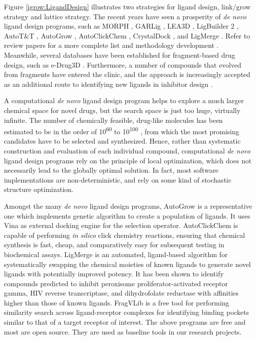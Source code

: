 Figure \ref{igrow:LigandDesign} \citep{363} illustrates two strategies for ligand design, link/grow strategy and lattice strategy. The recent years have seen a prosperity of \textit{de novo} ligand design programs, such as MORPH \citep{365}, GARLig \citep{471}, LEA3D \citep{1223}, LigBuilder 2 \citep{749}, AutoT\&T \citep{780}, AutoGrow \citep{466}, AutoClickChem \citep{1051}, CrystalDock \citep{954}, and LigMerge \citep{1181}. Refer to review papers for a more complete list \citep{363,367,472,1006} and methodology development \citep{470,982}. Meanwhile, several databases have been established for fragment-based drug design, such as e-Drug3D \citep{1125}. Furthermore, a number of compounds that evolved from fragments have entered the clinic, and the approach is increasingly accepted as an additional route to identifying new ligands in inhibitor design \citep{363,367,472,474,1006}.

A computational \textit{de novo} ligand design program helps to explore a much larger chemical space for novel drugs, but the search space is just too huge, virtually infinite. The number of chemically feasible, drug-like molecules has been estimated to be in the order of 10\textsuperscript{60} to 10\textsuperscript{100} \citep{1104}, from which the most promising candidates have to be selected and synthesized. Hence, rather than systematic construction and evaluation of each individual compound, computational \textit{de novo} ligand design programs rely on the principle of local optimization, which does not necessarily lead to the globally optimal solution. In fact, most software implementations are non-deterministic, and rely on some kind of stochastic structure optimization.

Amongst the many \textit{de novo} ligand design programs, AutoGrow \citep{466} is a representative one which implements genetic algorithm to create a population of ligands. It uses Vina \citep{595} as external docking engine for the selection operator. AutoClickChem \citep{1051} is capable of performing \textit{in silico} click chemistry reactions, ensuring that chemical synthesis is fast, cheap, and comparatively easy for subsequent testing in biochemical assays. LigMerge \citep{1181} is an automated, ligand-based algorithm for systematically swapping the chemical moieties of known ligands to generate novel ligands with potentially improved potency. It has been shown to identify compounds predicted to inhibit peroxisome proliferator-activated receptor gamma, HIV reverse transcriptase, and dihydrofolate reductase with affinities higher than those of known ligands. FragVLib \citep{1247} is a free tool for performing similarity search across ligand-receptor complexes for identifying binding pockets similar to that of a target receptor of interest. The above programs are free and most are open source. They are used as baseline tools in our research projects.

